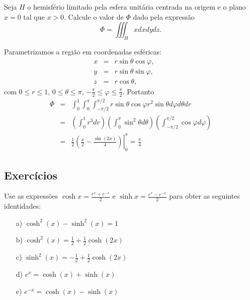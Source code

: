 \begin{exeresol} Seja $H$ o hemisfério limitado pela esfera unitária centrada na origem e o plano $x=0$ tal que $x>0$. Calcule o valor de $\Phi$ dado pela expressão
$$\Phi=\iiint_Hx dxdydz.$$ 
\end{exeresol}
\begin{resol}Parametrizamos a região em coordenadas esféricas:
\begin{eqnarray*}
x&=&r\sin\theta\cos\varphi,\\ y&=&r\sin\theta\sin\varphi,\qquad \\z&=&r\cos\theta,
\end{eqnarray*}
com $0\leq r \leq 1$, $0\leq \theta\leq {\pi}$, $-\frac{\pi}{2}\leq \varphi\leq \frac{\pi}{2}$.  
Portanto
\begin{eqnarray*}
\Phi&=&\int_0^1\int_0^\pi\int_{-\pi/2}^{\pi/2}r\sin\theta\cos\varphi r^2\sin\theta d\varphi d\theta dr\\
&=&\left(\int_0^1r^3dr\right)\left(\int_0^\pi\sin^2\theta d\theta \right)\left(\int_{-\pi/2}^{\pi/2}\cos\varphi d\varphi\right)\\
&=&\frac{1}{2}\left.\left(\frac{x}{2}-\frac{\sin(2x)}{4}\right)\right|_0^{\pi}=\frac{\pi}{4}
\end{eqnarray*}
\end{resol}


\subsection*{Exercícios}


\begin{exer}Use as expressões $\cosh x=\frac{e^x+e^{-x}}{2}$ e $\sinh x=\frac{e^x-e^{-x}}{2}$ para obter as seguintes identidades:
\begin{itemize}
\item[a)] $\cosh^2(x)-\sinh^2(x)=1$
\item[b)] $\cosh^2(x)=\frac{1}{2}+\frac{1}{2}\cosh(2x)$
\item[c)] $\sinh^2(x)=-\frac{1}{2}+\frac{1}{2}\cosh(2x)$
\item[d)] $e^x=\cosh(x)+\sinh(x)$
\item[e)] $e^{-x}=\cosh(x)-\sinh(x)$

\end{itemize}
\end{exer}

